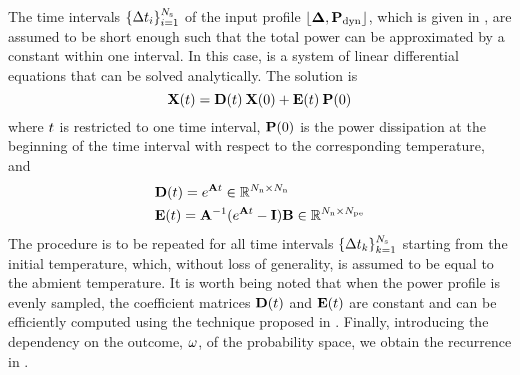 The time intervals $\{ \Delta t_i \}_{i = 1}^{N_\text{s}}$ of the input profile $\profPdyn$, which is given in , are assumed to be short enough such that the total power can be approximated by a constant within one interval. In this case,  is a system of linear differential equations that can be solved analytically. The solution is \cite{ukhov2012}
\begin{equation} \elabel{ode-solution}
  \vX(\t) = \mCF(\t) \: \vX(0) + \mCS(\t) \: \vP(0)
\end{equation}
where $t$ is restricted to one time interval, $\mathbf{P}(0)$ is the power dissipation at the beginning of the time interval with respect to the corresponding temperature, and
\begin{align*}
  & \mCF(\t) = e^{\mA \t} \in \real^{\nodes \times \nodes} \\
  & \mCS(\t) = \mA^{-1} (e^{\mA \t} - \mI) \mB \in \real^{\nodes \times \cores}
\end{align*}
The procedure is to be repeated for all time intervals $\{ \Delta t_k \}_{k=1}^{N_\text{s}}$ starting from the initial temperature, which, without loss of generality, is assumed to be equal to the abmient temperature. It is worth being noted that when the power profile is evenly sampled, the coefficient matrices $\mCF(\t)$ and $\mCS(\t)$ are constant and can be efficiently computed using the technique proposed in \cite{ukhov2012}.  Finally, introducing the dependency on the outcome, $\omega$, of the probability space, we obtain the recurrence in .
